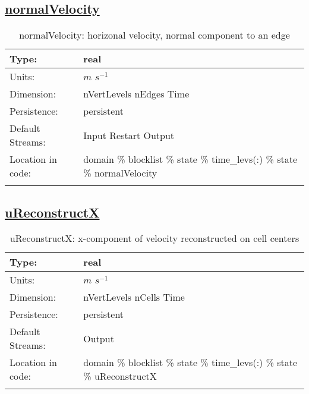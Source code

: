 \subsection[normalVelocity]{\hyperref[sec:var_tab_state]{normalVelocity}}
\label{subsec:var_sec_state_normalVelocity}
\begin{center}
\begin{longtable}{| p{2.0in} | p{4.0in} |}
        \hline 
        Type: & real \\
        \hline 
        Units: & $m$ $s^{-1}$ \\
        \hline 
        Dimension: & nVertLevels nEdges Time \\
        \hline 
        Persistence: & persistent \\
        \hline 
		 Default Streams: & Input Restart Output  \\
        \hline 
		 Location in code: & domain \% blocklist \% state \% time\_levs(:) \% state \% normalVelocity \\
		 \hline 
    \caption{normalVelocity: horizonal velocity, normal component to an edge}
\end{longtable}
\end{center}
\subsection[uReconstructX]{\hyperref[sec:var_tab_state]{uReconstructX}}
\label{subsec:var_sec_state_uReconstructX}
\begin{center}
\begin{longtable}{| p{2.0in} | p{4.0in} |}
        \hline 
        Type: & real \\
        \hline 
        Units: & $m$ $s^{-1}$ \\
        \hline 
        Dimension: & nVertLevels nCells Time \\
        \hline 
        Persistence: & persistent \\
        \hline 
		 Default Streams: & Output  \\
        \hline 
		 Location in code: & domain \% blocklist \% state \% time\_levs(:) \% state \% uReconstructX \\
		 \hline 
    \caption{uReconstructX: x-component of velocity reconstructed on cell centers}
\end{longtable}
\end{center}
